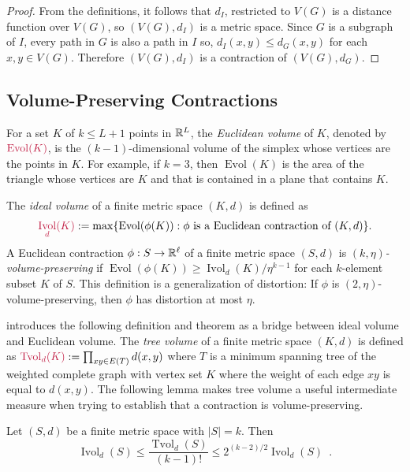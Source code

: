 \documentclass{patmorin}
\makeatletter
\renewcommand{\ge}{\geqslant}
\renewcommand{\le}{\leqslant}
\newcommand{\defin}[1]{\emph{\textcolor{brightmaroon}{#1}}}
\def\mathcolor#1#{\@mathcolor{#1}}
\def\@mathcolor#1#2#3{%
  \protect\leavevmode
  \begingroup
    \color#1{#2}#3%
  \endgroup
}
\newcommand{\mathdefin}[1]{\mathcolor{brightmaroon}{#1}}
\DeclareMathOperator{\evol}{Evol}
\DeclareMathOperator{\ivol}{Ivol}
\DeclareMathOperator{\tvol}{Tvol}
\makeatother
\begin{document}
\begin{proof}
  From the definitions, it follows that $d_I$, restricted to $V(G)$ is a distance function over $V(G)$, so $(V(G),d_I)$ is a metric space.  Since $G$ is a subgraph of $I$, every path in $G$ is also a path in $I$ so, $d_I(x,y)\le d_G(x,y)$ for each $x,y\in V(G)$.  Therefore $(V(G),d_I)$ is a contraction of $(V(G),d_G)$.
\end{proof}



\subsection{Volume-Preserving Contractions}
\label{contractions_section}

For a set $K$ of $k\le L+1$ points in $\mathbb{R}^L$, the \defin{Euclidean volume} of $K$, denoted by $\mathdefin{\evol(K)}$, is the $(k-1)$-dimensional volume of the simplex whose vertices are the points in $K$.  For example, if $k=3$, then $\evol(K)$ is the area of the triangle whose vertices are $K$ and that is contained in a plane that contains $K$.

The \defin{ideal volume} of a finite metric space $(K,d)$ is defined as $$\mathdefin{\ivol_d(K)}:=\max\{\evol(\phi(K)):\text{$\phi$ is a Euclidean contraction of $(K,d)$}\}.$$  A Euclidean contraction $\phi:S\to\mathbb{R}^{\ell}$ of a finite metric space $(S,d)$ is \defin{$(k,\eta)$-volume-preserving} if $\evol(\phi(K))\ge \ivol_d(K)/\eta^{k-1}$ for each $k$-element subset $K$ of $S$.  This definition is a generalization of distortion: If $\phi$ is $(2,\eta)$-volume-preserving, then $\phi$ has distortion at most $\eta$.

\citet{feige:approximating} introduces the following definition and theorem as a bridge between ideal volume and Euclidean volume. The \defin{tree volume} of a finite metric space $(K,d)$ is defined as $\mathdefin{\tvol_d(K)}:=\prod_{xy\in E(T)} d(x,y)$ where $T$ is a minimum spanning tree of the weighted complete graph with vertex set $K$ where the weight of each edge $xy$ is equal to $d(x,y)$.  The following lemma makes tree volume a useful intermediate measure when trying to establish that a contraction is volume-preserving.

\begin{lem}\label{tvol_vs_ivol}
  Let $(S,d)$ be a finite metric space with $|S|=k$.  Then
  \[
    \ivol_{d}(S) \le \frac{\tvol_d(S)}{(k-1)!} \le 2^{(k-2)/2}\ivol_d(S) \enspace .
  \]
\end{lem}
\end{document}

